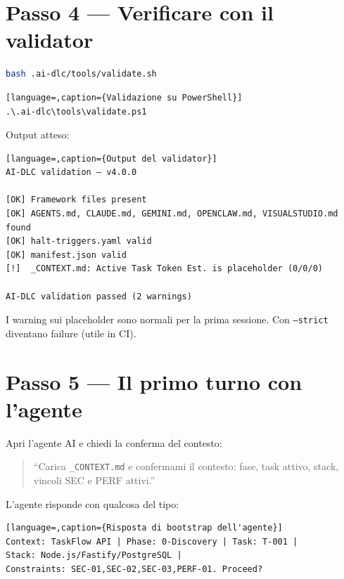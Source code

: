 \section{Passo 4 --- Verificare con il validator}
\label{sec:02-passo4-validate}

\begin{lstlisting}[language=bash,caption={Validazione su Bash}]
bash .ai-dlc/tools/validate.sh
\end{lstlisting}

\begin{lstlisting}[language=,caption={Validazione su PowerShell}]
.\.ai-dlc\tools\validate.ps1
\end{lstlisting}

Output atteso:

\begin{lstlisting}[language=,caption={Output del validator}]
AI-DLC validation — v4.0.0

[OK] Framework files present
[OK] AGENTS.md, CLAUDE.md, GEMINI.md, OPENCLAW.md, VISUALSTUDIO.md found
[OK] halt-triggers.yaml valid
[OK] manifest.json valid
[!]  _CONTEXT.md: Active Task Token Est. is placeholder (0/0/0)

AI-DLC validation passed (2 warnings)
\end{lstlisting}

I warning sui placeholder sono normali per la prima sessione. Con \texttt{--strict} diventano failure (utile in CI).

\section{Passo 5 --- Il primo turno con l'agente}
\label{sec:02-passo5-bootstrap}

Apri l'agente AI e chiedi la conferma del contesto:

\begin{quote}
``Carica \texttt{\_CONTEXT.md} e confermami il contesto: fase, task attivo, stack, vincoli SEC e PERF attivi.''
\end{quote}

L'agente risponde con qualcosa del tipo:

\begin{lstlisting}[language=,caption={Risposta di bootstrap dell'agente}]
Context: TaskFlow API | Phase: 0-Discovery | Task: T-001 |
Stack: Node.js/Fastify/PostgreSQL |
Constraints: SEC-01,SEC-02,SEC-03,PERF-01. Proceed?
\end{lstlisting}

